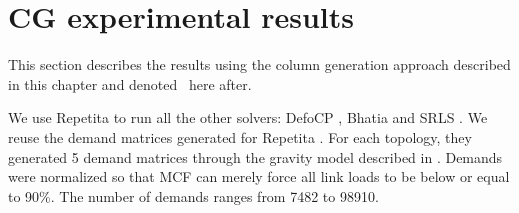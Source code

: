 
\section{CG experimental results}

This section describes the results using the column generation approach described
in this chapter and denoted \name~here after.


We use Repetita \cite{repetita} to run all the other solvers: DefoCP \cite{defo,hartert2015solving},
Bhatia \cite{bhatia} and SRLS \cite{steven}.
We reuse the demand matrices generated for Repetita \cite{repetita}.
For each topology, they generated 5 demand matrices through the gravity model
described in \cite{gravitymodel}.
Demands were normalized so that MCF can merely force all link loads to be below or equal to 90\%.
The number of demands ranges from 7482 to 98910.
% 


